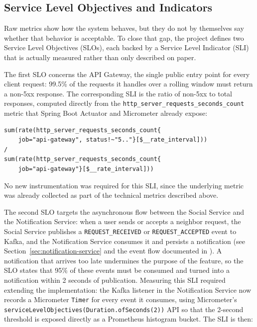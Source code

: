 \documentclass[12pt,a4paper]{article}
\begin{document}
\subsection{Service Level Objectives and Indicators}

Raw metrics show how the system behaves, but they do not by themselves say whether that behavior is acceptable. To close that gap, the project defines two Service Level Objectives (SLOs), each backed by a Service Level Indicator (SLI) that is actually measured rather than only described on paper.

The first SLO concerns the API Gateway, the single public entry point for every client request: 99.5\% of the requests it handles over a rolling window must return a non-5xx response. The corresponding SLI is the ratio of non-5xx to total responses, computed directly from the \texttt{http\_server\_requests\_seconds\_count} metric that Spring Boot Actuator and Micrometer already expose:

\begin{footnotesize}
\begin{verbatim}
sum(rate(http_server_requests_seconds_count{
    job="api-gateway", status!~"5.."}[$__rate_interval]))
/
sum(rate(http_server_requests_seconds_count{
    job="api-gateway"}[$__rate_interval]))
\end{verbatim}
\end{footnotesize}

No new instrumentation was required for this SLI, since the underlying metric was already collected as part of the technical metrics described above.

The second SLO targets the asynchronous flow between the Social Service and the Notification Service: when a user sends or accepts a neighbor request, the Social Service publishes a \texttt{REQUEST\_RECEIVED} or \texttt{REQUEST\_ACCEPTED} event to Kafka, and the Notification Service consumes it and persists a notification (see Section~\ref{sec:notification-service} and the event flow documented in ). A notification that arrives too late undermines the purpose of the feature, so the SLO states that 95\% of these events must be consumed and turned into a notification within 2 seconds of publication. Measuring this SLI required extending the implementation: the Kafka listener in the Notification Service now records a Micrometer \texttt{Timer} for every event it consumes, using Micrometer's \texttt{serviceLevelObjectives(Duration.ofSeconds(2))} API so that the 2-second threshold is exposed directly as a Prometheus histogram bucket. The SLI is then:
\end{document}
